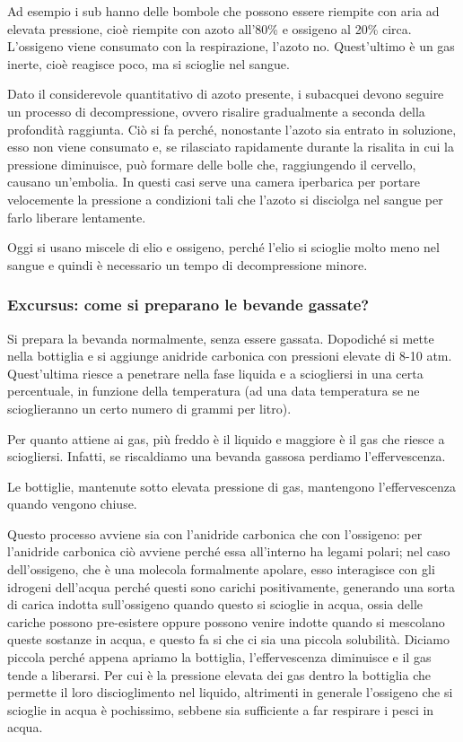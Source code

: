 \vspace{0.4cm}Ad esempio i sub hanno delle bombole che possono essere riempite con aria ad elevata pressione, cioè riempite con azoto all'80\% e ossigeno al 20\% circa. L'ossigeno viene consumato con la respirazione, l'azoto no. Quest'ultimo è un gas inerte, cioè reagisce poco, ma si scioglie nel sangue.

Dato il considerevole quantitativo di azoto presente, i subacquei devono seguire un processo di decompressione, ovvero risalire gradualmente a seconda della profondità raggiunta. Ciò si fa perché, nonostante l'azoto sia entrato in soluzione, esso non viene consumato e, se rilasciato rapidamente durante la risalita in cui la pressione diminuisce, può formare delle bolle che, raggiungendo il cervello, causano un'embolia. In questi casi serve una camera iperbarica per portare velocemente la pressione a condizioni tali che l'azoto si disciolga nel sangue per farlo liberare lentamente.

Oggi si usano miscele di elio e ossigeno, perché l'elio si scioglie molto meno nel sangue e quindi è necessario un tempo di decompressione minore.

\subsubsection{Excursus: come si preparano le bevande gassate?}

Si prepara la bevanda normalmente, senza essere gassata. Dopodiché si mette nella bottiglia e si aggiunge anidride carbonica con pressioni elevate di 8-10 atm. Quest'ultima riesce a penetrare nella fase liquida e a sciogliersi in una certa percentuale, in funzione della temperatura (ad una data temperatura se ne scioglieranno un certo numero di grammi per litro). 

Per quanto attiene ai gas, più freddo è il liquido e maggiore è il gas che riesce a sciogliersi. Infatti, se riscaldiamo una bevanda gassosa perdiamo l'effervescenza.

Le bottiglie, mantenute sotto elevata pressione di gas, mantengono l'effervescenza quando vengono chiuse.

Questo processo avviene sia con l'anidride carbonica che con l'ossigeno: per l'anidride carbonica ciò avviene perché essa all'interno ha legami polari; nel caso dell'ossigeno, che è una molecola formalmente apolare, esso interagisce con gli idrogeni dell'acqua perché questi sono carichi positivamente, generando una sorta di carica indotta sull'ossigeno quando questo si scioglie in acqua, ossia delle cariche possono pre-esistere oppure possono venire indotte quando si mescolano queste sostanze in acqua, e questo fa si che ci sia una piccola solubilità. Diciamo piccola perché appena apriamo la bottiglia, l'effervescenza diminuisce e il gas tende a liberarsi. Per cui è la pressione elevata dei gas dentro la bottiglia che permette il loro discioglimento nel liquido, altrimenti in generale l'ossigeno che si scioglie in acqua è pochissimo, sebbene sia sufficiente a far respirare i pesci in acqua.

